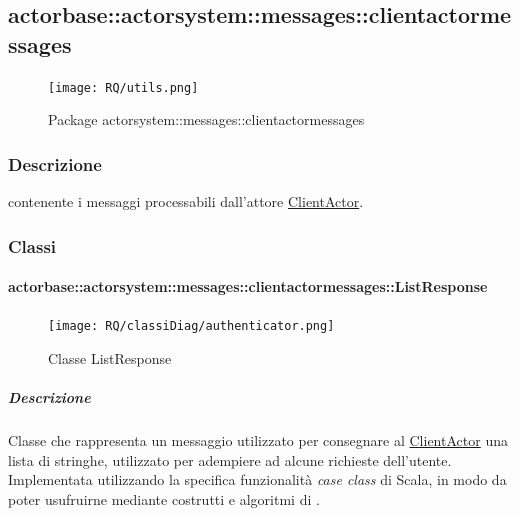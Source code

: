 \documentclass{scalatekids-article}
\begin{document}

\subsection{actorbase::actorsystem::messages::clientactormessages}
\label{sec:actorbase::actorsystem::messages::clientactormessages}

\begin{figure}[H]
  \begin{center}
    \texttt{[image: RQ/utils.png]}
    \caption{Package actorsystem::messages::clientactormessages}
  \end{center}
\end{figure}

\subsubsection{Descrizione}
 contenente i messaggi processabili dall'attore \hyperref[sec:actorbase::actorsystem::actors::clientactor::ClientActor]{ClientActor}.

\subsubsection{Classi}

\paragraph{actorbase::actorsystem::messages::clientactormessages::ListResponse}
\label{sec:actorbase::actorsystem::messages::clientactormessages::ListResponse}

\begin{figure}[H]
  \begin{center}
    \texttt{[image: RQ/classiDiag/authenticator.png]}
    \caption{Classe ListResponse}
  \end{center}
\end{figure}

\subparagraph{Descrizione}
Classe che rappresenta un messaggio utilizzato per consegnare al
\hyperref[sec:actorbase::actorsystem::actors::clientactor::ClientActor]{ClientActor} una lista di stringhe, utilizzato per adempiere ad alcune
richieste dell'utente.\\Implementata utilizzando la specifica funzionalità \textit{case class} di Scala,
in modo da poter usufruirne mediante costrutti e algoritmi di
.
\end{document}

